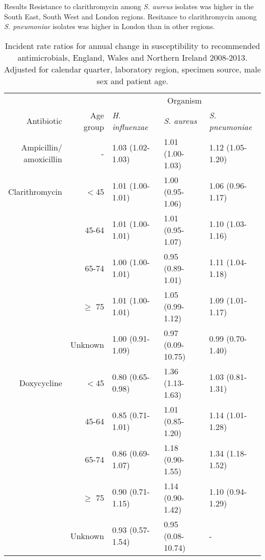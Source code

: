 \documentclass[final, 14pt]{beamer}
\begin{document}
\begin{frame}
\begin{columns}[t]
\begin{minipage}[t]{.95\textwidth}
\begin{block}{Results}
   Resistance to clarithromycin among \textit{S. aureus} isolates was higher in the South East, South West and London regions. 
   Resitance to clarithromycin among \textit{S. pneumoniae} isolates was higher in London than in other regions. \\
     \begin{table}
   \centering
   \small%
   \begin{tabular}{rrlll}
  \hline
 &  & \multicolumn{3}{c}{Organism}\\
  \cline{3-5}
Antibiotic & \shortstack{Age \\group} & \textit{H. influenzae} & \textit{S. aureus} & \textit{S. pneumoniae} \\ 
  \midrule
\shortstack{Ampicillin/\\amoxicillin} & - & 1.03 (1.02-1.03) & 1.01 (1.00-1.03) & 1.12 (1.05-1.20) \\ 
Clarithromycin & $<$45 & 1.01 (1.00-1.01) & 1.00 (0.95-1.06) & 1.06 (0.96-1.17) \\ 
  & 45-64 & 1.01 (1.00-1.01) & 1.01 (0.95-1.07) & 1.10 (1.03-1.16) \\ 
  & 65-74 & 1.00 (1.00-1.01) & 0.95 (0.89-1.01) & 1.11 (1.04-1.18) \\ 
  & $\ge$ 75 & 1.01 (1.00-1.01) & 1.05 (0.99-1.12) & 1.09 (1.01-1.17) \\ 
  & Unknown & 1.00 (0.91-1.09) & 0.97 (0.09-10.75) & 0.99 (0.70-1.40) \\ 
Doxycycline & $<$45 & 0.80 (0.65-0.98) & 1.36 (1.13-1.63) & 1.03 (0.81-1.31) \\ 
  & 45-64 & 0.85 (0.71-1.01) & 1.01 (0.85-1.20) & 1.14 (1.01-1.28) \\ 
  & 65-74 & 0.86 (0.69-1.07) & 1.18 (0.90-1.55) & 1.34 (1.18-1.52) \\ 
  & $\ge$ 75 & 0.90 (0.71-1.15) & 1.14 (0.90-1.42) & 1.10 (0.94-1.29) \\ 
  & Unknown & 0.93 (0.57-1.54) & 0.95 (0.08-10.74) & - \\ 
\bottomrule  
\end{tabular}
   \caption{Incident rate ratios for annual change in susceptibility to recommended antimicrobials, England, Wales and Northern Ireland 2008-2013.
   Adjusted for calendar quarter, laboratory region, specimen source, male sex and patient age.}
   \label{tab:table1}
   \end{table} 


\end{block}
\end{minipage}
\end{columns}
\end{frame}
\end{document}
